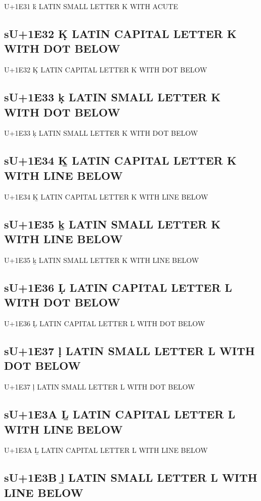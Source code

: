 U+1E31 ḱ LATIN SMALL LETTER K WITH ACUTE

\subsection{sU+1E32 Ḳ LATIN CAPITAL LETTER K WITH DOT BELOW}

U+1E32 Ḳ LATIN CAPITAL LETTER K WITH DOT BELOW

\subsection{sU+1E33 ḳ LATIN SMALL LETTER K WITH DOT BELOW}

U+1E33 ḳ LATIN SMALL LETTER K WITH DOT BELOW

\subsection{sU+1E34 Ḵ LATIN CAPITAL LETTER K WITH LINE BELOW}

U+1E34 Ḵ LATIN CAPITAL LETTER K WITH LINE BELOW

\subsection{sU+1E35 ḵ LATIN SMALL LETTER K WITH LINE BELOW}

U+1E35 ḵ LATIN SMALL LETTER K WITH LINE BELOW

\subsection{sU+1E36 Ḷ LATIN CAPITAL LETTER L WITH DOT BELOW}

U+1E36 Ḷ LATIN CAPITAL LETTER L WITH DOT BELOW

\subsection{sU+1E37 ḷ LATIN SMALL LETTER L WITH DOT BELOW}

U+1E37 ḷ LATIN SMALL LETTER L WITH DOT BELOW

\subsection{sU+1E3A Ḻ LATIN CAPITAL LETTER L WITH LINE BELOW}

U+1E3A Ḻ LATIN CAPITAL LETTER L WITH LINE BELOW

\subsection{sU+1E3B ḻ LATIN SMALL LETTER L WITH LINE BELOW}

